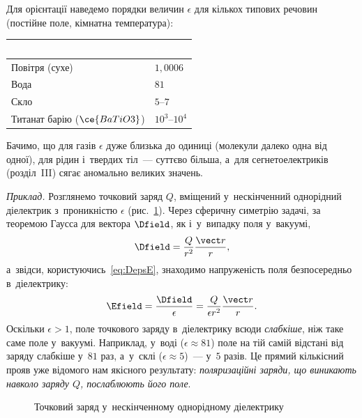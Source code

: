 Для орієнтації наведемо порядки величин $\epsilon$ для кількох типових речовин (постійне
поле, кімнатна температура):
\begin{center}
	\begin{tabularx}{\linewidth}{|>{\raggedright\arraybackslash}X|>{\centering\arraybackslash}X|}
\hline
\rowcolor{themecolorlight}\multicolumn{1}{|c|}{\textcolor{white}{\textbf{Речовина}}} & \textcolor{white}{\textbf{$\epsilon$}} \\ \hline
Повітря (сухе) & $1{,}0006$ \\ \hline
\rowcolor{gray!10}Вода & $81$ \\ \hline
Скло & $5$--$7$ \\ \hline
\rowcolor{gray!10}Титанат барію ($\ce{BaTiO3}$) & $10^3$--$10^4$ \\ \hline
\end{tabularx}
\end{center}
Бачимо, що для газів $\epsilon$ дуже близька до одиниці (молекули далеко одна від одної),
для рідин і~твердих тіл~--- суттєво більша, а~для сегнетоелектриків (розділ~III) сягає
аномально великих значень.

\emph{Приклад.} Розглянемо точковий заряд $Q$, вміщений у~нескінченний однорідний
діелектрик з~проникністю $\epsilon$ (рис.~\ref{pic:PointChargeDielectric}). Через сферичну
симетрію задачі, за теоремою Гаусса для вектора $\Dfield$, як і~у~випадку поля у~вакуумі,
\begin{equation*}
	\Dfield = \frac{Q}{r^2}\frac{\vect r}{r},
\end{equation*}
а~звідси, користуючись~\eqref{eq:DepsE}, знаходимо напруженість поля безпосередньо
в~діелектрику:
\begin{equation*}
	\Efield = \frac{\Dfield}{\epsilon} = \frac{Q}{\epsilon r^2}\frac{\vect r}{r}.
\end{equation*}
Оскільки $\epsilon > 1$, поле точкового заряду в~діелектрику всюди \emph{слабкіше}, ніж
таке саме поле у~вакуумі. Наприклад, у~воді ($\epsilon \approx 81$) поле на тій самій
відстані від заряду слабкіше у~$81$ раз, а~у~склі ($\epsilon \approx 5$)~--- у~$5$ разів.
Це прямий кількісний прояв уже відомого нам якісного результату: \emph{поляризаційні
	заряди, що виникають навколо заряду $Q$, послаблюють його поле}.

\begin{figure}\centering
	\caption{Точковий заряд у~нескінченному однорідному
		діелектрику\label{pic:PointChargeDielectric}}
\end{figure}


